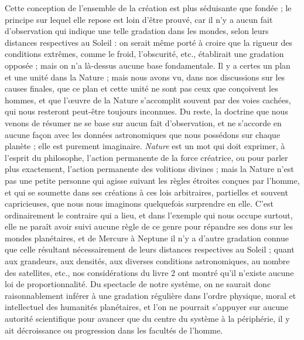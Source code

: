\documentclass[a4paper, 11pt, oneside]{article}
\begin{document}
Cette conception de l'ensemble de la création est plus séduisante que fondée ; le principe sur lequel elle repose est loin d'être prouvé, car il n'y a aucun fait d'observation qui indique une telle gradation dans les mondes, selon leurs distances respectives au Soleil : on serait même porté à croire que la rigueur des conditions extrêmes, comme le froid, l'obscurité, etc., établirait une gradation opposée ; mais on n'a là-dessus aucune base fondamentale. Il y a certes un plan et une unité dans la Nature ; mais nous avons vu, dans nos discussions sur les causes finales, que ce plan et cette unité ne sont pas ceux que conçoivent les hommes, et que l'œuvre de la Nature s'accomplit souvent par des voies cachées, qui nous resteront peut-être toujours inconnues. Du reste, la doctrine que nous venons de résumer ne se base sur aucun fait d'observation, et ne s'accorde en aucune façon avec les données astronomiques que nous possédons sur chaque planète ; elle est purement imaginaire. \emph{Nature} est un mot qui doit exprimer, à l'esprit du philosophe, l'action permanente de la force créatrice, ou pour parler plus exactement, l'action permanente des volitions divines ; mais la Nature n'est pas une petite personne qui agisse suivant les règles étroites conçues par l'homme, et qui se soumette dans ses créations à ces lois arbitraires, partielles et souvent capricieuses, que nous nous imaginons quelquefois surprendre en elle. C'est ordinairement le contraire qui a lieu, et dans l'exemple qui nous occupe surtout, elle ne paraît avoir suivi aucune règle de ce genre pour répandre ses dons sur les mondes planétaires, et de Mercure à Neptune il n'y a d'autre gradation connue que celle résultant nécessairement de leurs distances respectives au Soleil ; quant aux grandeurs, aux densités, aux diverses conditions astronomiques, au nombre des satellites, etc., nos considérations du livre 2 ont montré qu'il n'existe aucune loi de proportionnalité. Du spectacle de notre système, on ne saurait donc raisonnablement inférer à une gradation régulière dans l'ordre physique, moral et intellectuel des humanités planétaires, et l'on ne pourrait s'appuyer sur aucune autorité scientifique pour avancer que du centre du système à la périphérie, il y ait décroissance ou progression dans les facultés de l'homme.
\end{document}
